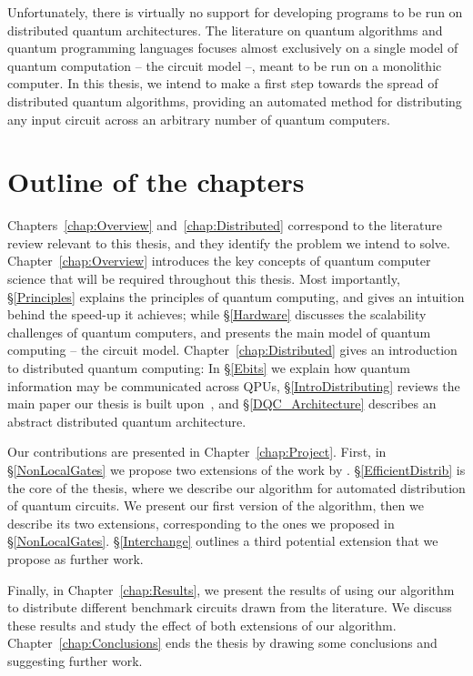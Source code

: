 Unfortunately, there is virtually no support for developing programs to be run on distributed quantum architectures. The literature on quantum algorithms and quantum programming languages focuses almost exclusively on a single model of quantum computation -- the circuit model --, meant to be run on a monolithic computer. In this thesis, we intend to make a first step towards the spread of distributed quantum algorithms, providing an automated method for distributing any input circuit across an arbitrary number of quantum computers.

\section{Outline of the chapters}

Chapters~\ref{chap:Overview} and~\ref{chap:Distributed} correspond to the literature review relevant to this thesis, and they identify the problem we intend to solve. Chapter~\ref{chap:Overview} introduces the key concepts of quantum computer science that will be required throughout this thesis. Most importantly, \S\ref{Principles} explains the principles of quantum computing, and gives an intuition behind the speed-up it achieves; while \S\ref{Hardware} discusses the scalability challenges of quantum computers, and presents the main model of quantum computing -- the circuit model. Chapter~\ref{chap:Distributed} gives an introduction to distributed quantum computing: In \S\ref{Ebits} we explain how quantum information may be communicated across QPUs, \S\ref{IntroDistributing} reviews the main paper our thesis is built upon~\citep{NonLocalCNOT}, and \S\ref{DQC_Architecture} describes an abstract distributed quantum architecture.

Our contributions are presented in Chapter~\ref{chap:Project}. First, in \S\ref{NonLocalGates} we propose two extensions of the work by \citet{NonLocalCNOT}. \S\ref{EfficientDistrib} is the core of the thesis, where we describe our algorithm for automated distribution of quantum circuits. We present our first version of the algorithm, then we describe its two extensions, corresponding to the ones we proposed in \S\ref{NonLocalGates}. \S\ref{Interchange} outlines a third potential extension that we propose as further work.

Finally, in Chapter~\ref{chap:Results}, we present the results of using our algorithm to distribute different benchmark circuits drawn from the literature. We discuss these results and study the effect of both extensions of our algorithm. Chapter~\ref{chap:Conclusions} ends the thesis by drawing some conclusions and suggesting further work.